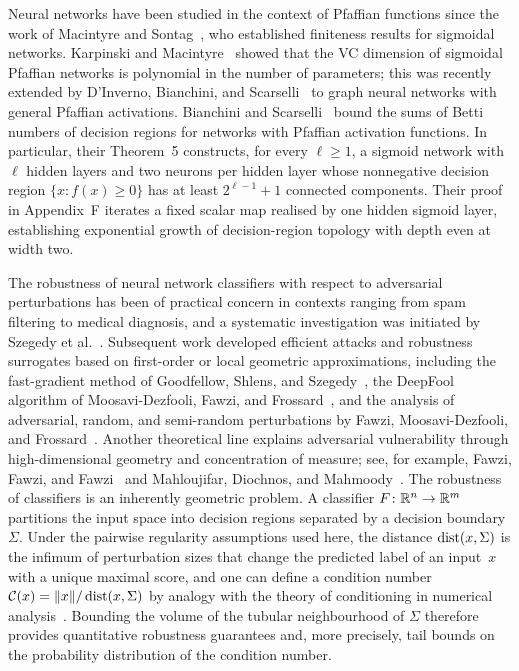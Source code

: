 Neural networks have been studied in the context of Pfaffian functions since the work of Macintyre and Sontag~\cite{macintyre1993finiteness}, who established finiteness results for sigmoidal networks. Karpinski and Macintyre~\cite{karpinski1997polynomial} showed that the VC dimension of sigmoidal Pfaffian networks is polynomial in the number of parameters; this was recently extended by D'Inverno, Bianchini, and Scarselli~\cite{dinverno2024vc} to graph neural networks with general Pfaffian activations. Bianchini and Scarselli~\cite{bianchini2014complexity} bound the sums of Betti numbers of decision regions for networks with Pfaffian activation functions. In particular, their Theorem~5 constructs, for every $\ell\ge1$, a sigmoid network with $\ell$ hidden layers and two neurons per hidden layer whose nonnegative decision region $\{x\colon f(x)\ge0\}$ has at least $2^{\ell-1}+1$ connected components. Their proof in Appendix~F iterates a fixed scalar map realised by one hidden sigmoid layer, establishing exponential growth of decision-region topology with depth even at width two.

The robustness of neural network classifiers with respect to adversarial perturbations has been of practical concern in contexts ranging from spam filtering to medical diagnosis, and a systematic investigation was initiated by Szegedy et al.~\cite{szegedy2013intriguing}. Subsequent work developed efficient attacks and robustness surrogates based on first-order or local geometric approximations, including the fast-gradient method of Goodfellow, Shlens, and Szegedy~\cite{goodfellow2015explaining}, the DeepFool algorithm of Moosavi-Dezfooli, Fawzi, and Frossard~\cite{moosavi2016deepfool}, and the analysis of adversarial, random, and semi-random perturbations by Fawzi, Moosavi-Dezfooli, and Frossard~\cite{fawzi2016robustness}. Another theoretical line explains adversarial vulnerability through high-dimensional geometry and concentration of measure; see, for example, Fawzi, Fawzi, and Fawzi~\cite{fawzi2018adversarial} and Mahloujifar, Diochnos, and Mahmoody~\cite{mahloujifar2019curse}. The robustness of classifiers is an inherently geometric problem. A classifier $F\colon \mathbb{R}^n\to \mathbb{R}^m$ partitions the input space into decision regions separated by a decision boundary $\Sigma$. Under the pairwise regularity assumptions used here, the distance $\operatorname{dist}(x,\Sigma)$ is the infimum of perturbation sizes that change the predicted label of an input~$x$ with a unique maximal score, and one can define a condition number $\mathcal{C}(x) = \|x\|/\operatorname{dist}(x,\Sigma)$ by analogy with the theory of conditioning in numerical analysis~\cite{burgisser2013condition}. Bounding the volume of the tubular neighbourhood of $\Sigma$ therefore provides quantitative robustness guarantees and, more precisely, tail bounds on the probability distribution of the condition number.

